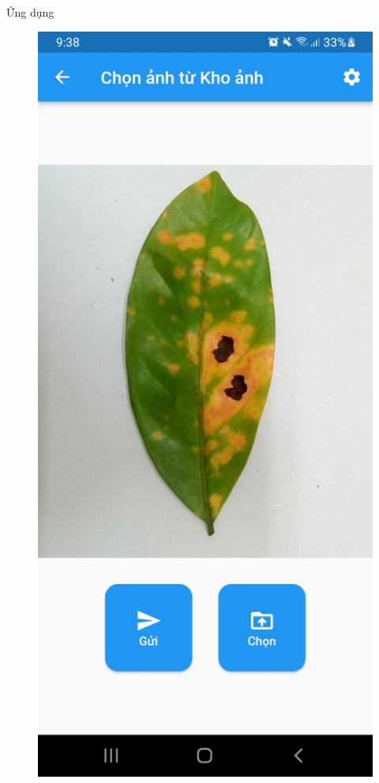 \documentclass{beamer}
\begin{document}
\begin{frame}[allowframebreaks]{Ứng dụng}
\begin{figure}[H]
		\includegraphics[scale=0.1]{images/screenshot3.jpg}

\end{figure}
\end{frame}
\end{document}
